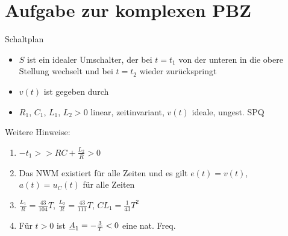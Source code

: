 \chapter{Aufgabe zur komplexen PBZ}

\begin{circuitikz}
  
\end{circuitikz}

\begin{minipage}{0.5\textwidth}
Schaltplan
\end{minipage}
\begin{minipage}{0.5\textwidth}
\begin{itemize}
  \item $S$ ist ein idealer Umschalter, der bei $t=t_1$
    von der unteren in die obere Stellung wechselt
    und bei $t=t_2$ wieder zurückspringt
  \item $v(t)$ ist gegeben durch\\
  \item $R_1$, $C_1$, $L_1$, $L_2 > 0$ linear, zeitinvariant,
    $v(t)$ ideale, ungest. SPQ
\end{itemize}
\end{minipage}

Weitere Hinweise:
\begin{enumerate}
  \item $-t_1 >> RC+\frac{L_2}{R} > 0$
  \item Das NWM existiert für alle Zeiten und es gilt $e(t) = v(t)$,
    $a(t) = u_C(t)$ für alle Zeiten
  \item $\frac{L_1}{R} = \frac{43}{104}T$,
    $\frac{L_2}{R} = \frac{43}{111}T$,
    $CL_1 = \frac{1}{43}T^2$
  \item Für $t>0$ ist $\cn A_1 = -\frac{3}{T}<0$ eine nat. Freq.
\end{enumerate}


